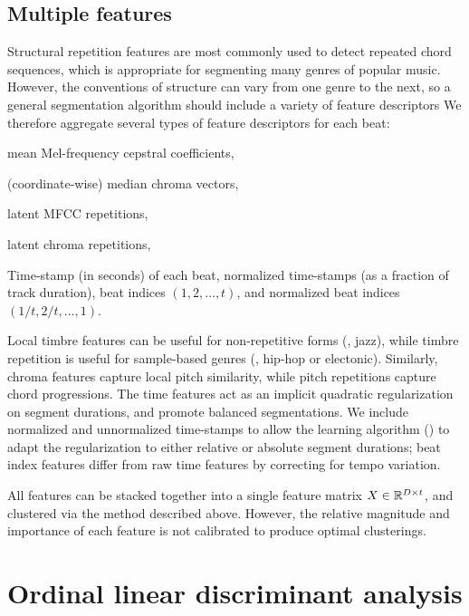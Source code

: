\documentclass{article}
\begin{document}
\subsection{Multiple features}
Structural repetition features are most commonly used to detect repeated chord sequences, which is appropriate for
segmenting many genres of popular music.  However, the conventions of structure can vary from one genre to the next,
so a general segmentation algorithm should include a variety of feature descriptors
We therefore aggregate several types of feature descriptors for each beat:
\begin{description}\addtolength{\itemsep}{-0.35\baselineskip}%
\item[Timbre] mean Mel-frequency cepstral coefficients,
\item[Pitch] (coordinate-wise) median chroma vectors,
\item[Timbre repetition] latent MFCC repetitions,
\item[Pitch repetition] latent chroma repetitions,
\item[Time] Time-stamp (in seconds) of each beat, normalized time-stamps (as a fraction of track duration), 
beat indices $(1, 2, \ldots, t)$, and normalized beat indices\\ $(1/t, 2/t, \ldots, 1)$.
\end{description}
Local timbre features can be useful for non-repetitive forms (\eg, jazz), while timbre repetition is useful for sample-based genres (\eg, hip-hop or electonic). 
Similarly, chroma features capture local pitch similarity, while pitch repetitions capture chord progressions.
The time features act as an implicit quadratic regularization on segment durations, and promote balanced segmentations. 
We include normalized and unnormalized time-stamps to allow the learning algorithm () to adapt the regularization to 
either relative or absolute segment durations; beat index features differ from raw time features by correcting for tempo variation.

All features can be stacked together into a single feature matrix $X \in \mathbb{R}^{D\times t}$, and clustered via the method described
above. However, the relative magnitude and importance of each feature is not calibrated to produce optimal clusterings. 

\section{Ordinal linear discriminant analysis}
%
\end{document}
